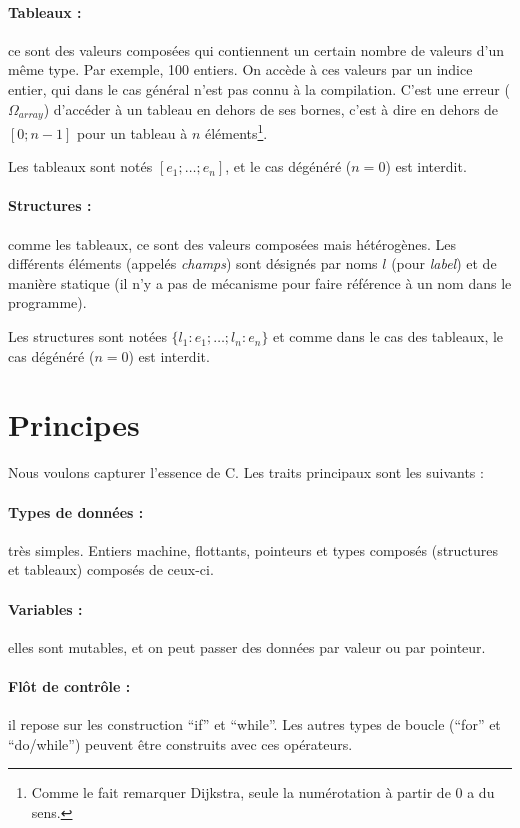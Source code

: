 \paragraph{Tableaux :} ce sont des valeurs composées qui contiennent un certain
nombre de valeurs d'un même type. Par exemple, 100 entiers. On accède à ces
valeurs par un indice entier, qui dans le cas général n'est pas connu à la
compilation. C'est une erreur ($Ω_{array}$) d'accéder à un tableau en dehors de
ses bornes, c'est à dire en dehors de $[0;n-1]$ pour un tableau à $n$
éléments\footnote{Comme le fait remarquer Dijkstra, seule la numérotation à
partir de 0 a du sens\cite{EWD831}.}.

Les tableaux sont notés $[e_1; …; e_n]$, et le cas dégénéré ($n = 0$) est
interdit.

\paragraph{Structures :} comme les tableaux, ce sont des valeurs composées mais
hétérogènes. Les différents éléments (appelés \emph{champs}) sont désignés par
noms $l$ (pour \emph{label}) et de manière statique (il n'y a pas de mécanisme
pour faire référence à un nom dans le programme).

Les structures sont notées $\{ l_1 : e_1 ; … ; l_n : e_n \}$ et comme dans le
cas des tableaux, le cas dégénéré ($n = 0$) est interdit.


\section{Principes}

Nous voulons capturer l'essence de C. Les traits principaux sont les suivants :

\paragraph{Types de données :} très simples. Entiers machine, flottants,
pointeurs et types composés (structures et tableaux) composés de ceux-ci.

\paragraph{Variables :} elles sont mutables, et on peut passer des données par
valeur ou par pointeur.

\paragraph{Flôt de contrôle :} il repose sur les construction ``if'' et
``while''. Les autres types de boucle (``for'' et ``do/while'') peuvent être
construits avec ces opérateurs.

